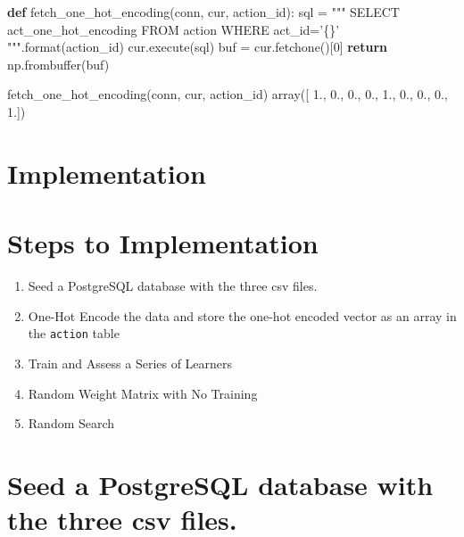 \documentclass[]{report}
\newenvironment{Shaded}{}{}
\newcommand{\KeywordTok}[1]{\textcolor[rgb]{0.00,0.44,0.13}{\textbf{{#1}}}}
\newcommand{\DecValTok}[1]{\textcolor[rgb]{0.25,0.63,0.44}{{#1}}}
\newcommand{\StringTok}[1]{\textcolor[rgb]{0.25,0.44,0.63}{{#1}}}
\newcommand{\ControlFlowTok}[1]{\textcolor[rgb]{0.00,0.44,0.13}{\textbf{{#1}}}}
\newcommand{\OperatorTok}[1]{\textcolor[rgb]{0.40,0.40,0.40}{{#1}}}
\newcommand{\BuiltInTok}[1]{{#1}}
\newcommand{\NormalTok}[1]{{#1}}
\begin{document}
\begin{Shaded}
\begin{Highlighting}[]
\KeywordTok{def} \NormalTok{fetch_one_hot_encoding(conn, cur, action_id):}
    \NormalTok{sql }\OperatorTok{=} \StringTok{"""}
\StringTok{        SELECT act_one_hot_encoding}
\StringTok{        FROM action}
\StringTok{        WHERE act_id='\{\}'}
\StringTok{        """}\NormalTok{.}\BuiltInTok{format}\NormalTok{(action_id)}
    \NormalTok{cur.execute(sql)}
    \NormalTok{buf }\OperatorTok{=} \NormalTok{cur.fetchone()[}\DecValTok{0}\NormalTok{]}
    \ControlFlowTok{return} \NormalTok{np.frombuffer(buf)}
    


\NormalTok{fetch_one_hot_encoding(conn, cur, action_id)}
\NormalTok{array([ }\DecValTok{1}\NormalTok{.,  }\DecValTok{0}\NormalTok{.,  }\DecValTok{0}\NormalTok{.,  }\DecValTok{0}\NormalTok{.,  }\DecValTok{1}\NormalTok{.,  }\DecValTok{0}\NormalTok{.,  }\DecValTok{0}\NormalTok{.,  }\DecValTok{0}\NormalTok{.,  }\DecValTok{1}\NormalTok{.])}
\end{Highlighting}
\end{Shaded}

\chapter{Implementation}

\chapter{Steps to Implementation}\label{steps-to-implementation}

\begin{enumerate}
\def\labelenumi{\arabic{enumi}.}
\tightlist
\item
  Seed a PostgreSQL database with the three csv files.
\item
  One-Hot Encode the data and store the one-hot encoded vector as an
  array in the \texttt{action} table
\item
  Train and Assess a Series of Learners
\item
  Random Weight Matrix with No Training
\item
  Random Search
\end{enumerate}

\chapter{Seed a PostgreSQL database with the three csv
files.}\label{seed-a-postgresql-database-with-the-three-csv-files.}
\end{document}
